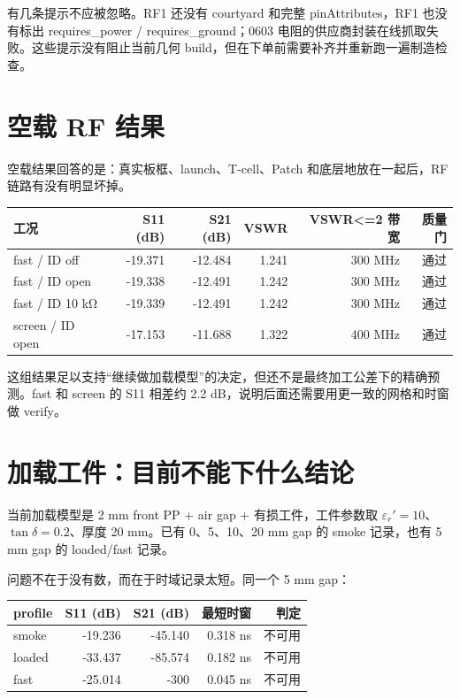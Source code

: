 \documentclass[UTF8,a4paper,11pt]{ctexart}
\begin{document}
有几条提示不应被忽略。RF1 还没有 courtyard 和完整 pinAttributes，RF1 也没有标出 requires\_power / requires\_ground；0603 电阻的供应商封装在线抓取失败。这些提示没有阻止当前几何 build，但在下单前需要补齐并重新跑一遍制造检查。

\section{空载 RF 结果}

空载结果回答的是：真实板框、launch、T-cell、Patch 和底层地放在一起后，RF 链路有没有明显坏掉。

\begin{tabularx}{\linewidth}{lrrrrr}
\toprule
工况 & S11 (dB) & S21 (dB) & VSWR & VSWR<=2 带宽 & 质量门 \\
\midrule
fast / ID off & -19.371 & -12.484 & 1.241 & 300 MHz & 通过 \\
fast / ID open & -19.338 & -12.491 & 1.242 & 300 MHz & 通过 \\
fast / ID 10 kΩ & -19.339 & -12.491 & 1.242 & 300 MHz & 通过 \\
screen / ID open & -17.153 & -11.688 & 1.322 & 400 MHz & 通过 \\
\bottomrule
\end{tabularx}

这组结果足以支持“继续做加载模型”的决定，但还不是最终加工公差下的精确预测。fast 和 screen 的 S11 相差约 2.2 dB，说明后面还需要用更一致的网格和时窗做 verify。

\section{加载工件：目前不能下什么结论}

当前加载模型是 2 mm front PP + air gap + 有损工件，工件参数取 $\varepsilon_r'=10$、$\tan\delta=0.2$、厚度 20 mm。已有 0、5、10、20 mm gap 的 smoke 记录，也有 5 mm gap 的 loaded/fast 记录。

问题不在于没有数，而在于时域记录太短。同一个 5 mm gap：

\begin{tabularx}{\linewidth}{lrrrr}
\toprule
profile & S11 (dB) & S21 (dB) & 最短时窗 & 判定 \\
\midrule
smoke & -19.236 & -45.140 & 0.318 ns & 不可用 \\
loaded & -33.437 & -85.574 & 0.182 ns & 不可用 \\
fast & -25.014 & -300 & 0.045 ns & 不可用 \\
\bottomrule
\end{tabularx}
\end{document}
